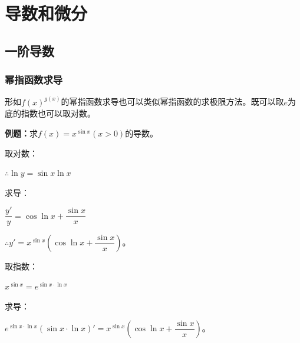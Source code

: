 \chapter{导数和微分}\label{chap:导数和微分}

%


\section{一阶导数}

\subsection{幂指函数求导}

形如$f(x)^{g(x)}$的幂指函数求导也可以类似幂指函数的求极限方法。既可以取$e$为底的指数也可以取对数。

\textbf{例题：}求$f(x)=x^{\sin x}(x>0)$的导数。

取对数：

$\therefore\ln y=\sin x\ln x$

求导：

$\dfrac{y'}{y}=\cos\ln x+\dfrac{\sin x}{x}$

$\therefore y'=x^{\sin x}\left(\cos\ln x+\dfrac{\sin x}{x}\right)$。

取指数：

$x^{\sin x}=e^{\sin x\cdot\ln x}$

求导：

$e^{\sin x\cdot\ln x}(\sin x\cdot\ln x)'=x^{\sin x}\left(\cos\ln x+\dfrac{\sin x}{x}\right)$。

